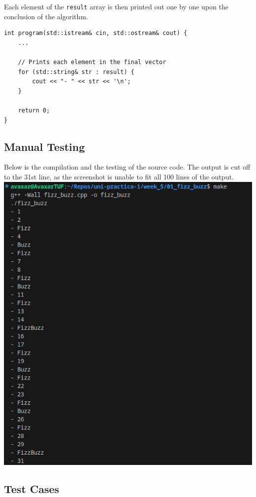 \documentclass[12pt]{article}
\begin{document}
Each element of the \texttt{result} array is then printed out one by one upon the conclusion of the algorithm.

\begin{verbatim}
int program(std::istream& cin, std::ostream& cout) {
    ...

    // Prints each element in the final vector
    for (std::string& str : result) {
        cout << "- " << str << '\n';
    }

    return 0;
}
\end{verbatim}

\pagebreak
\subsection{Manual Testing}
Below is the compilation and the testing of the source code. The output is cut off to the 31st line, as the screenshot is unable to fit all 100 lines of the output.
\newline\includegraphics[width=\textwidth]{01_fizz_buzz}

\pagebreak
\subsection{Test Cases}
\end{document}
